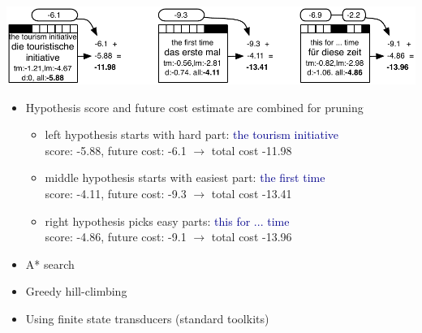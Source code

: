 \documentclass[landscape]{slides}
\newcommand{\example}[1]{\textcolor{darkblue}{\rm #1}}
\begin{document}
\begin{center}
\includegraphics[scale=1.4]{future-cost-comparison.pdf}
\end{center}
\begin{itemize}
\item Hypothesis score and future cost estimate are combined for pruning
\begin{itemize}
\item left hypothesis starts with hard part: \example{the tourism initiative}\\
score: -5.88, future cost: -6.1 $\rightarrow$ total cost -11.98 \vspace{3mm}
\item middle hypothesis starts with easiest part: \example{the first time}\\
score: -4.11, future cost: -9.3 $\rightarrow$ total cost -13.41 \vspace{3mm}
\item right hypothesis picks easy parts: \example{this for ... time}\\
score: -4.86, future cost: -9.1 $\rightarrow$ total cost -13.96
\end{itemize}
\end{itemize}


\vspace{30mm}
\begin{itemize}
\item A* search
\item Greedy hill-climbing
\item Using finite state transducers (standard toolkits)
\end{itemize}

\end{document}
